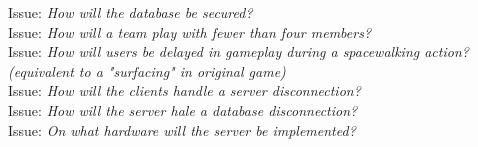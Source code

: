 Issue: \textit{How will the database be secured?}
\\

Issue: \textit{How will a team play with fewer than four members?}
\\

Issue: \textit{How will users be delayed in gameplay during a spacewalking action? (equivalent to a "surfacing" in original game)}
\\

Issue: \textit{How will the clients handle a server disconnection?}
\\

Issue: \textit{How will the server hale a database disconnection?}
\\

Issue: \textit{On what hardware will the server be implemented?}
\\
